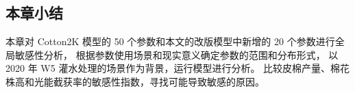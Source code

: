 \begin{spacing}{}
    \section{本章小结}
    本章对 Cotton2K 模型的 50 个参数和本文的改版模型中新增的 20 个参数进行全局敏感性分析，%
    根据参数使用场景和现实意义确定参数的范围和分布形式，%
    以 2020 年 W5 灌水处理的场景作为背景，运行模型进行分析。%
    比较皮棉产量、棉花株高和光能截获率的敏感性指数，寻找可能导致敏感的原因。
\end{spacing}